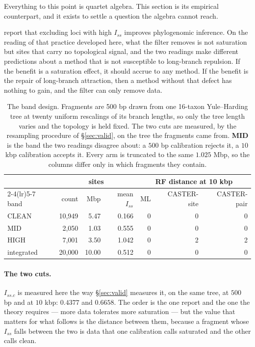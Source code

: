 \documentclass[preprint,12pt,authoryear]{elsarticle}
\newcommand{\Iss}{I_{ss}}
\newcommand{\Issc}{I_{ss.c}}
\theoremstyle{definition}
\theoremstyle{remark}
\begin{document}
Everything to this point is quartet algebra. This section is its empirical
counterpart, and it exists to settle a question the algebra cannot reach.

\citet{duchene2022saturation} report that excluding loci with high $\Iss$
improves phylogenomic inference. On the reading of that practice developed
here, what the filter removes is not saturation but sites that carry no
topological signal, and the two readings make different predictions about a
method that is not susceptible to long-branch repulsion. If the benefit is a
saturation effect, it should accrue to any method. If the benefit is the
repair of long-branch attraction, then a method without that defect has
nothing to gain, and the filter can only remove data.

\begin{table}[t]
\centering
\small
\begin{tabular}{lrrrrrr}
\hline
& \multicolumn{3}{c}{sites} & \multicolumn{3}{c}{RF distance at 10 kbp} \\
\cmidrule(lr){2-4}\cmidrule(lr){5-7}
band & count & Mbp & mean $\Iss$ & ML & CASTER-site & CASTER-pair \\
\hline
CLEAN     & 10{,}949 & 5.47 & 0.166 & 0 & 0 & 0 \\
MID       & 2{,}050 & 1.03 & 0.555 & 0 & 0 & 0 \\
HIGH      & 7{,}001 & 3.50 & 1.042 & 0 & 2 & 2 \\
integrated & 20{,}000 & 10.00 & 0.512 & 0 & 0 & 0 \\
\hline
\end{tabular}
\caption{The band design. Fragments are 500 bp drawn from one 16-taxon
Yule--Harding tree at twenty uniform rescalings of its branch lengths, so
only the tree length varies and the topology is held fixed. The two cuts are
measured, by the resampling procedure of \S\ref{sec:valid}, on the tree the
fragments came from. \textbf{MID} is the band the two readings disagree
about: a $500$ bp calibration rejects it, a $10$ kbp calibration accepts it.
Every arm is truncated to the same $1.025$ Mbp, so the columns differ only in
which fragments they contain.}
\label{tab:bands}
\end{table}

\paragraph{The two cuts.} $\Issc$ is measured here the way
\S\ref{sec:valid} measures it, on the same tree, at $500$ bp and at
$10$ kbp: $0.4377$ and $0.6658$. The order is the one
\citet{xia2003iss} report and the one the theory requires --- more data
tolerates more saturation --- but the value that matters for what follows is
the distance between them, because a fragment whose $\Iss$ falls between the
two is data that one calibration calls saturated and the other calls clean.
\end{document}
